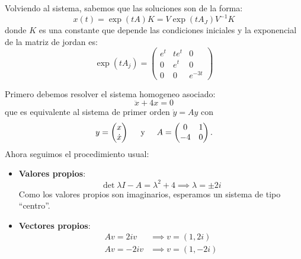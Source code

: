 \documentclass[10pt]{article}
\begin{document}
\begin{plist}
Volviendo al sistema, sabemos que las soluciones son de la forma:
\[
    x(t)
    =
    \exp\left(t A\right) K
    =
    V \exp\left(tA_J\right) V^{-1} K
\]
donde \(K\) es una constante que depende las condiciones iniciales y la
exponencial de la matriz de jordan es:
\[
\exp\left(tA_j\right)
=
\begin{pmatrix}
e^t & te^t & 0\\
0 & e^t & 0\\
0 & 0 & e^{-3t}
\end{pmatrix}
\]

\item Primero debemos resolver el sistema homogeneo asociado:
\[
    \ddot{x} + 4x = 0
\]
que es equivalente al sistema de primer orden \(\dot{y} = Ay\) con
\[
    y = \begin{pmatrix} x \\ \dot{x} \end{pmatrix}
    \hspace{.5cm}\text{y}\hspace{.5cm}
    A =
    \begin{pmatrix}
    0 & 1\\
    -4 & 0
    \end{pmatrix}
.\]
Ahora seguimos el procedimiento usual:
\begin{itemize}
    \item \textbf{Valores propios}:
    \[
        \det{\lambda I - A}
        =
        \lambda^2 + 4
        \implies
        \lambda = \pm 2i
    \]
    Como los valores propios son imaginarios, esperamos un sistema de tipo
    ``centro''.

    \item \textbf{Vectores propios}:
    \begin{align*}
        Av = 2i v &\implies v = (1, 2i)\\
        Av =-2i v &\implies v = (1, -2i)\\
    \end{align*}


\end{itemize}
\end{plist}
\end{document}
